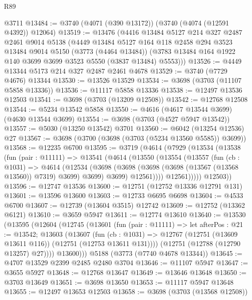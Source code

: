 \begin{lexlean}{R89}
\begin{coremodule}
    @3711
@13484 := @3740 (@4071 (@390 @13172)) (@3740 (@4074 (@12591 @4392)) @12064)
@13519 := @13476
    (@4416
      @13484
      @5127
      @214
      @327
      @2487
      @2461
      @9014
      @5138
      (@4449
        @13484
        @5127
        @164
        @118
        @2458
        @294
        @3523
        @13484
        @9014
        @5150
        (@3773 (@4464 @13484))
        (@3783 @13484 @164 @1922 @140 @3699 @3699 @3523 @5550 (@3837 @13484) @5553)))
@13526 := @4449 @13344 @5173 @214 @327 @2487 @2461 @4678
@13529 := @3740 (@7729 @4676) @13344
@13530 := @13526 @13529
@13534 := @3698 (@3703 (@11107 @5858 @13336))
@13536 := @11117 @5858 @13336
@13538 := @12497 @13536 @12503
@13541 := @3698 (@3703 (@13209 @12508))
@13542 := @12768 @12508
@13544 := @5234 @13542 @5858
@13550 := @4616 (@4617 @13544 @3699) (@4630 @13544 @3699)
@13554 := @3698 (@3703 (@4527 @5947 @13542))
@13557 := @5030 (@13250 @13542) @3701
@13560 := @6042 (@13254 @12536) @27
@13567 := @3698 (@3700 (@3698 (@3703 (@5234 @13560 @5585)) @3699))
@13568 := @12235 @6700
@13595 := @3719
    (@4614
      (@7929
        (@13534
          (@13538
            (fun (pair : @11111) =>
            @13541
              (@4614
                (@13550
                  (@13554
                    (@13557
                      (fun (cb : @1031) =>
                      @4614
                        (@12534
                          (@3698
                            (@3698 (@3698 (@3698 (@13567 (@13568 @13560)) @7319) @3699) @3699)
                            @3699)
                          @12561))))
                  @12561)))))
        @12503))
@13596 := @12747 @13536
@13600 := @12751 (@12752 @13336 @12791 @131)
@13601 := @13596 @13600
@13603 := @12733 @6695 @6698
@13604 := @4533 @6700
@13607 := @12739 (@13604 @3515) @12742
@13609 := @12752 (@13362 @6121)
@13610 := @3659 @5947
@13611 := @12774 @13610
@13640 := @13530
    (@13595
      (@12604
        (@12745
          (@13601
            (fun (pair : @11111) =>
            let afterPos : @21 := @13542;
            @13603
              (@13607
                (fun (cb : @1031) =>
                @12767 (@12751 (@13609 @13611 @116)) (@12751 (@12753 @13611 @131))))
              (@12751 (@12788 (@12790 @13257) @27))))
          @13600)))
    @5188
    (@3773 (@7740 @4678 @13344))
@13645 := @4707 @13529 @2399 @2485 @2480 @3704
@13646 := @11107 @5947
@13647 := @3655 @5927
@13648 := @12768 @13647
@13649 := @13646 @13648
@13650 := @3703 @13649
@13651 := @3698 @13650
@13653 := @11117 @5947 @13648
@13655 := @12497 @13653 @12503
@13658 := @3698 (@3703 (@13568 @12508))

\end{coremodule}
\end{lexlean}
